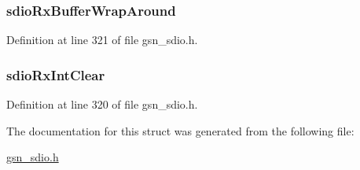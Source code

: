 \hypertarget{a00225_ae969f4ef854e8afc1b61acec9feac4d6}{
\subsubsection[{sdioRxBufferWrapAround}]{ {\bf sdioRxBufferWrapAround}}}
\label{a00225_ae969f4ef854e8afc1b61acec9feac4d6}


Definition at line 321 of file gsn\_\-sdio.h.

\hypertarget{a00225_ab172bcd1d3f27a9679b0f42a91476917}{
\subsubsection[{sdioRxIntClear}]{ {\bf sdioRxIntClear}}}
\label{a00225_ab172bcd1d3f27a9679b0f42a91476917}


Definition at line 320 of file gsn\_\-sdio.h.



The documentation for this struct was generated from the following file:\begin{DoxyCompactItemize}
\item 
\hyperlink{a00584}{gsn\_\-sdio.h}\end{DoxyCompactItemize}
